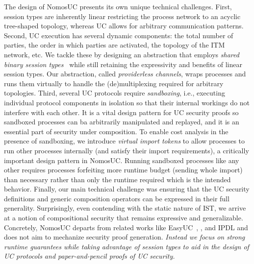 
The design of NomosUC presents its own unique technical challenges.
First, session types are inherently linear restricting the process network to an acyclic tree-shaped topology,
whereas UC allows for arbitrary communication patterns.
Second, UC execution has several dynamic components: the total number of parties, the order in which parties are activated,
the topology of the ITM network, etc.
We tackle these by designing an abstraction that employs \emph{shared binary session types}~\cite{balzer2017manifest}
while still retaining the expressivity and benefits of linear session types.
Our abstraction, called \emph{providerless channels}, wraps processes and runs them virtually to handle
the (de)multiplexing required for arbitrary topologies.
Third, several UC protocols require \emph{sandboxing}, i.e., executing individual protocol components in isolation so that their
internal workings do not interfere with each other.
It is a vital design pattern for UC security proofs so sandboxed processes can ba arbitrarily manipulated and replayed, and it
is an essential part of security under composition.
To enable cost analysis in the presence of sandboxing, we introduce \emph{virtual import tokens} to allow processes to
run other processes internally (and satisfy their import requirements), a critically important design pattern in NomosUC.
Running sandboxed processes like any other requires processes forfeiting more runtime budget (sending whole import) than necessary rather than 
only the runtime required which is the intended behavior.
Finally, our main technical challenge was ensuring that the UC security definitions and generic composition operators
can be expressed in their full generality.
Surprisingly, even contending with the static nature of IST, we arrive at a notion of compositional security
that remains expressive and generalizable.
Concretely, NomosUC departs from related works like EasyUC~\cite{easyuc}, \citet{barbosa}, and IPDL\cite{ipdl} and does
not aim to mechanize security proof generation.
\emph{Instead we focus on strong runtime guarantees while taking advantage of session types to aid in the design of UC protocols and paper-and-pencil proofs of UC security.}

